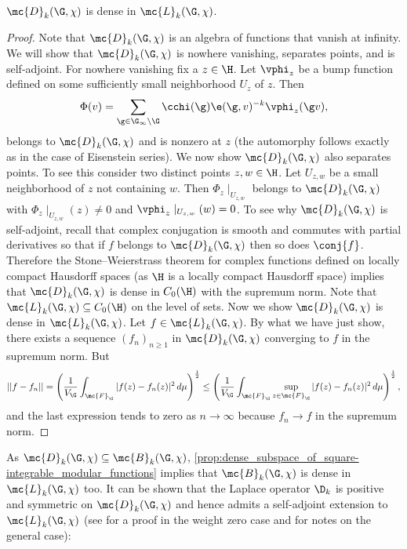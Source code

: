     \begin{proposition}\label{prop:dense_subspace_of_square-integrable_modular_functions}
      $\mc{D}_{k}(\G,\chi)$ is dense in $\mc{L}_{k}(\G,\chi)$.
    \end{proposition}
    \begin{proof}
      Note that $\mc{D}_{k}(\G,\chi)$ is an algebra of functions that vanish at infinity. We will show that $\mc{D}_{k}(\G,\chi)$ is nowhere vanishing, separates points, and is self-adjoint. For nowhere vanishing fix a $z \in \H$. Let $\vphi_{z}$ be a bump function defined on some sufficiently small neighborhood $U_{z}$ of $z$. Then
      \[
        \Phi(v) = \sum_{\g \in \G_{\infty}\backslash\G}\cchi(\g)\e(\g,v)^{-k}\vphi_{z}(\g v),
      \]
      belongs to $\mc{D}_{k}(\G,\chi)$ and is nonzero at $z$ (the automorphy follows exactly as in the case of Eisenstein series). We now show $\mc{D}_{k}(\G,\chi)$ also separates points. To see this consider two distinct points $z,w \in \H$. Let $U_{z,w}$ be a small neighborhood of $z$ not containing $w$. Then $\Phi_{z}\mid_{U_{z,w}}$ belongs to $\mc{D}_{k}(\G,\chi)$ with $\Phi_{z}\mid_{U_{z,w}}(z) \neq 0$ and $\vphi_{z}\mid_{U_{z,w}}(w) = 0$. To see why $\mc{D}_{k}(\G,\chi)$ is self-adjoint, recall that complex conjugation is smooth and commutes with partial derivatives so that if $f$ belongs to $\mc{D}_{k}(\G,\chi)$ then so does $\conj{f}$. Therefore the Stone–Weierstrass theorem for complex functions defined on locally compact Hausdorff spaces (as $\H$ is a locally compact Hausdorff space) implies that $\mc{D}_{k}(\G,\chi)$ is dense in $C_{0}(\H)$ with the supremum norm. Note that $\mc{L}_{k}(\G,\chi) \subseteq C_{0}(\H)$ on the level of sets. Now we show $\mc{D}_{k}(\G,\chi)$ is dense in $\mc{L}_{k}(\G,\chi)$. Let $f \in \mc{L}_{k}(\G,\chi)$. By what we have just show, there exists a sequence $(f_{n})_{n \ge 1}$ in $\mc{D}_{k}(\G,\chi)$ converging to $f$ in the supremum norm. But 
      \[
        ||f-f_{n}|| = \left(\frac{1}{V_{\G}}\int_{\mc{F}_{\G}}|f(z)-f_{n}(z)|^{2}\,d\mu\right)^{\frac{1}{2}} \le \left(\frac{1}{V_{\G}}\int_{\mc{F}_{\G}}\sup_{z \in \mc{F}_{\G}}|f(z)-f_{n}(z)|^{2}\,d\mu\right)^{\frac{1}{2}},
      \]
      and the last expression tends to zero as $n \to \infty$ because $f_{n} \to f$ in the supremum norm.
    \end{proof}

    As $\mc{D}_{k}(\G,\chi) \subseteq \mc{B}_{k}(\G,\chi)$, \cref{prop:dense_subspace_of_square-integrable_modular_functions} implies that $\mc{B}_{k}(\G,\chi)$ is dense in $\mc{L}_{k}(\G,\chi)$ too. It can be shown that the Laplace operator $\D_{k}$ is positive and symmetric on $\mc{D}_{k}(\G,\chi)$ and hence admits a self-adjoint extension to $\mc{L}_{k}(\G,\chi)$ (see \cite{iwaniec2002spectral} for a proof in the weight zero case and \cite{cohenmodular2017} for notes on the general case):

